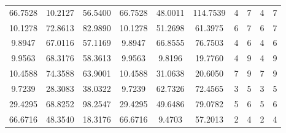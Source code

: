\documentclass[withoutpreface,bwprint]{cumcmthesis}
\begin{document}
\begin{appendices}
\begin{table}[htbp!]
\begin{tabular}{@{}cccccccccc@{}}
				66.7528                          & 10.2127                          & 56.5400                          & 66.7528                          & 48.0011                          & 114.7539                         & 4                    & 7                    & 4                      & 7                      \\
				10.1278                          & 72.8613                          & 82.9890                          & 10.1278                          & 51.2698                          & 61.3975                          & 6                    & 7                    & 6                      & 7                      \\
				9.8947                           & 67.0116                          & 57.1169                          & 9.8947                           & 66.8555                          & 76.7503                          & 4                    & 6                    & 4                      & 6                      \\
				9.9563                           & 68.3176                          & 58.3613                          & 9.9563                           & 9.8196                           & 19.7760                          & 4                    & 9                    & 4                      & 9                      \\
				10.4588                          & 74.3588                          & 63.9001                          & 10.4588                          & 31.0638                          & 20.6050                          & 7                    & 9                    & 7                      & 9                      \\
				9.7239                           & 28.3083                          & 38.0322                          & 9.7239                           & 62.7326                          & 72.4565                          & 3                    & 5                    & 3                      & 5                      \\
				29.4295                          & 68.8252                          & 98.2547                          & 29.4295                          & 49.6486                          & 79.0782                          & 5                    & 6                    & 5                      & 6                      \\
				66.6716                          & 48.3540                          & 18.3176                          & 66.6716                          & 9.4703                           & 57.2013                          & 2                    & 4                    & 2                      & 4                      \\

\end{tabular}
\end{table}
\end{appendices}
\end{document}
